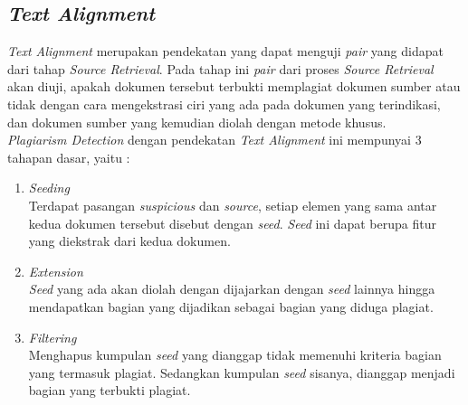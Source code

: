 \documentclass[../Proposal.tex]{subfiles}
\begin{document}
		\subsection{\textit{Text Alignment}}
		\textit{Text Alignment} merupakan pendekatan yang dapat menguji \textit{pair} yang didapat dari tahap \textit{Source Retrieval}. Pada tahap ini \textit{pair} dari proses \textit{Source Retrieval} akan diuji, apakah dokumen tersebut terbukti memplagiat dokumen sumber atau tidak dengan cara mengekstrasi ciri yang ada pada dokumen yang terindikasi, dan dokumen sumber yang kemudian diolah dengan metode khusus. \\

		\noindent \textit{Plagiarism Detection} dengan pendekatan \textit{Text Alignment} ini mempunyai 3 tahapan dasar, yaitu :

		\begin{enumerate}
			\item \textit{Seeding} \\
			Terdapat pasangan \textit{suspicious} dan \textit{source}, setiap elemen yang sama antar kedua dokumen tersebut disebut dengan \textit{seed}. \textit{Seed} ini dapat berupa fitur yang diekstrak dari kedua dokumen.

			\item \textit{Extension} \\
			\textit{Seed} yang ada akan diolah dengan dijajarkan dengan \textit{seed} lainnya hingga mendapatkan bagian yang dijadikan sebagai bagian yang diduga plagiat.

			\item \textit{Filtering} \\
			Menghapus kumpulan \textit{seed} yang dianggap tidak memenuhi kriteria bagian yang termasuk plagiat. Sedangkan kumpulan \textit{seed} sisanya, dianggap menjadi bagian yang terbukti plagiat.
		\end{enumerate}
\end{document}
